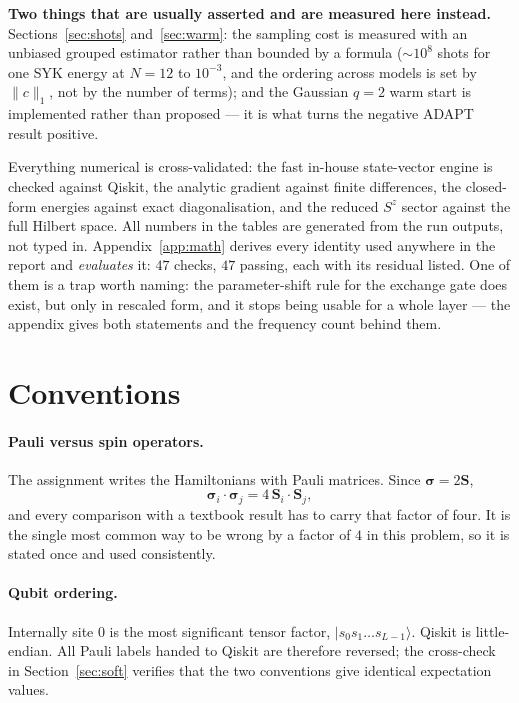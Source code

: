 \documentclass[10pt,a4paper]{article}
\newcommand{\ket}[1]{\lvert #1 \rangle}
\newcommand{\ssig}{\bm{\sigma}}
\begin{document}
\textbf{Two things that are usually asserted and are measured here instead.}
Sections~\ref{sec:shots} and~\ref{sec:warm}: the sampling cost is
measured with an unbiased grouped estimator rather than bounded by a
formula ($\sim\!10^8$ shots for one SYK energy at $N=12$ to $10^{-3}$, and the
ordering across models is set by $\|c\|_1$, not by the number of terms); and
the Gaussian $q=2$ warm start is implemented rather than proposed --- it is
what turns the negative ADAPT result positive.

Everything numerical is cross-validated: the fast in-house state-vector engine
is checked against Qiskit, the analytic gradient against finite differences,
the closed-form energies against exact diagonalisation, and the reduced
$S^z$ sector against the full Hilbert space. All numbers in the tables are
generated from the run outputs, not typed in.
Appendix~\ref{app:math} derives every identity used anywhere in the report and
\emph{evaluates} it: $47$ checks, $47$ passing, each with its residual listed.
One of them is a trap worth naming: the parameter-shift rule for the exchange
gate does exist, but only in rescaled form, and it stops being usable for a
whole layer --- the appendix gives both statements and the frequency count
behind them.

\section{Conventions}

\paragraph{Pauli versus spin operators.} The assignment writes the
Hamiltonians with Pauli matrices. Since $\ssig = 2\bm{S}$,
\begin{equation}
  \ssig_i \cdot \ssig_j = 4\, \bm{S}_i \cdot \bm{S}_j ,
\end{equation}
and every comparison with a textbook result has to carry that factor of four.
It is the single most common way to be wrong by a factor of $4$ in this
problem, so it is stated once and used consistently.

\paragraph{Qubit ordering.} Internally site $0$ is the most significant tensor
factor, $\ket{s_0 s_1 \dots s_{L-1}}$. Qiskit is little-endian. All Pauli
labels handed to Qiskit are therefore reversed; the cross-check in
Section~\ref{sec:soft} verifies that the two conventions give identical
expectation values.
\end{document}

